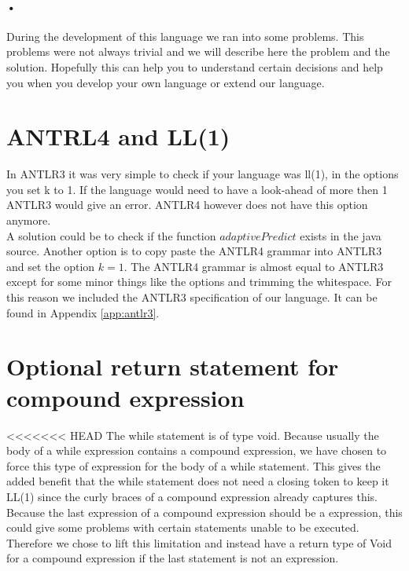 \paragraph{•}
During the development of this language we ran into some problems. This problems were not always trivial and we will describe here the problem and the solution. Hopefully this can help you to understand certain decisions and help you when you develop your own language or extend our language.
\section{ANTRL4 and LL(1)}
In ANTLR3 it was very simple to check if your language was ll(1), in the options you set k to 1. If the language would need to have a look-ahead of more then 1 ANTLR3 would give an error. ANTLR4 however does not have this option anymore. \\
A solution could be to check if the function $adaptivePredict$ exists in the java source. Another option is to copy paste the ANTLR4 grammar into ANTLR3 and set the option $k=1$. The ANTLR4 grammar is almost equal to ANTLR3 except for some minor things like the options and trimming the whitespace. For this reason we included the ANTLR3 specification of our language. It can be found in Appendix \ref{app:antlr3}.

\section{Optional return statement for compound expression}
<<<<<<< HEAD
The while statement is of type void. Because usually the body of a while expression contains a compound expression, we have chosen to force this type of expression for the body of a while statement. This gives the added benefit that the while statement does not need a closing token to keep it LL(1) since the curly braces of a compound expression already captures this. Because the last expression of a compound expression should be a expression, this could give some problems with certain statements unable to be executed. Therefore we chose to lift this limitation and instead have a return type of Void for a compound expression if the last statement is not an expression.

